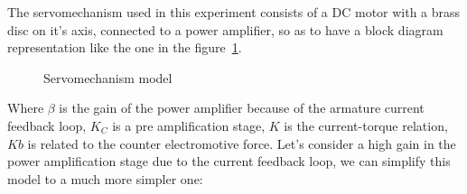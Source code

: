 \documentclass[journal]{IEEEtran}
\begin{document}
        The servomechanism used in this experiment consists of a DC motor with a brass disc on it's axis, connected to a power amplifier, so as to have a block diagram representation like the one in the figure~\ref{fig_servomodel}.

        \begin{figure}[!t]
            \centering
            \caption{Servomechanism model}
            \label{fig_servomodel}
        \end{figure}

        Where $\beta$ is the gain of the power amplifier because of the armature current feedback loop, $K_C$ is a pre amplification stage, $K$ is the current-torque relation, $Kb$ is related to the counter electromotive force. Let's consider a high gain in the power amplification stage due to the current feedback loop, we can simplify this model to a much more simpler one:
\end{document}

